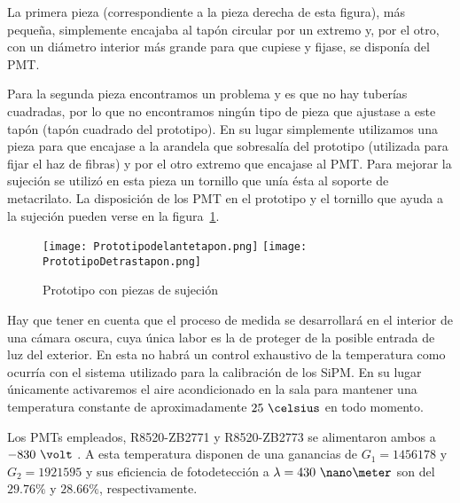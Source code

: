 La primera pieza (correspondiente a la pieza derecha de esta figura), más pequeña, simplemente encajaba al tapón circular por un extremo y, por el otro, con un diámetro interior más grande para que cupiese y fijase, se disponía del PMT.

Para la segunda pieza encontramos un problema y es que no hay tuberías cuadradas, por lo que no encontramos ningún tipo de pieza  que ajustase a este tapón (tapón cuadrado del prototipo). En su lugar simplemente utilizamos una pieza para que encajase a la arandela que sobresalía del prototipo (utilizada para fijar el haz de fibras) y por el otro extremo que encajase al PMT. Para mejorar la sujeción se utilizó en esta pieza un tornillo que unía ésta al soporte de metacrilato. La disposición de los PMT en el prototipo y el tornillo que ayuda a la sujeción pueden verse  en  la figura~\ref{prototipotapones}.

\begin{figure}[htb]
\centering
{
\texttt{[image: Prototipodelantetapon.png]} 
}
{
\texttt{[image: PrototipoDetrastapon.png]} 
}
\caption{Prototipo con piezas de sujeción \label{prototipotapones}}
\end{figure} 

Hay que tener en cuenta que el proceso de medida se desarrollará en el interior de una cámara oscura, cuya única labor es la de proteger de la posible entrada de luz del exterior. En esta no habrá un control exhaustivo de la temperatura como ocurría con el sistema utilizado para la calibración de los SiPM. En su lugar únicamente activaremos el aire acondicionado en la sala para mantener una temperatura constante de aproximadamente $25~\celsius$ en todo momento.

Los PMTs empleados, R8520-ZB2771 y R8520-ZB2773 se alimentaron ambos a $-830~\volt$ . A esta temperatura disponen de una ganancias de $G_1=1456178$ y $G_2=1921595$ y sus eficiencia de fotodetección a $\lambda=430~\nano\meter$ son del $29.76\%$ y $28.66\%$, respectivamente. 
